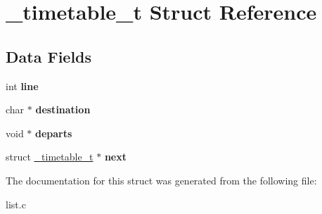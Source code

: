 \hypertarget{struct__timetable__t}{}\section{\+\_\+timetable\+\_\+t Struct Reference}
\label{struct__timetable__t}
\subsection*{Data Fields}
\begin{DoxyCompactItemize}
\item 
\hypertarget{struct__timetable__t_a1bafc9a0722f2aefddadc94467347cde}{}int {\bfseries line}\label{struct__timetable__t_a1bafc9a0722f2aefddadc94467347cde}

\item 
\hypertarget{struct__timetable__t_a7c783e14de0c40e1ac2b499fdbda88fd}{}char $\ast$ {\bfseries destination}\label{struct__timetable__t_a7c783e14de0c40e1ac2b499fdbda88fd}

\item 
\hypertarget{struct__timetable__t_a115566951b3d329f862d39fd7141a34f}{}void $\ast$ {\bfseries departs}\label{struct__timetable__t_a115566951b3d329f862d39fd7141a34f}

\item 
\hypertarget{struct__timetable__t_a1c49830312d2d5cc9015faf8ff846239}{}struct \hyperlink{struct__timetable__t}{\+\_\+timetable\+\_\+t} $\ast$ {\bfseries next}\label{struct__timetable__t_a1c49830312d2d5cc9015faf8ff846239}

\end{DoxyCompactItemize}


The documentation for this struct was generated from the following file\+:\begin{DoxyCompactItemize}
\item 
list.\+c\end{DoxyCompactItemize}

